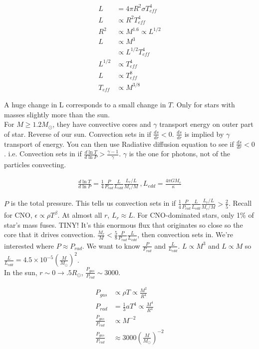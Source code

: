 \documentclass[10pt,a4paper]{article}
\newcommand{\pt}{\propto}
\begin{document}
\begin{align}
L & = 4 \pi R^2 \sigma T_{eff}^4\\
L & \pt R^2 T_{eff}^4\\
R^2  & \pt M^{1.6} \pt L^{1/2}\\
L & \pt M^3\\
   & \pt L^{1/2}T_{eff}^4\\
L^{1/2} & \pt T_{eff}^4\\
L & \pt T_{eff}^8\\
T_{eff} & \pt M^{3/8}
\end{align}

A huge change in L corresponds to a small change in $T$. Only for stars with masses slightly more than the sun. \\

For $M \geq 1.2 M_\odot$, they have convective cores and $\gamma$ transport energy on outer part of star. Reverse of our sun. Convection sets in if $\frac{ds}{dr} < 0$. $\frac{ds}{dr}$ is implied by $\gamma$ transport of energy. You can then use Radiative diffusion equation to see if $\frac{ds}{dr}<0$. i.e. Convection sets in if $\frac{d \ln T}{d \ln P} > \frac{\gamma -1}{\gamma}$. $\gamma$ is the one for photons, not of the particles convecting. 

\begin{align}
\frac{d \ln T}{d \ln P}  = \frac{1}{4} \frac{P}{P_{rad}}\frac{L}{L_{edd}}\frac{L_r/L}{M_r/M}~,L_{edd} = \frac{4 \pi G M_c}{\kappa}
\end{align}

$P$ is the total pressure. This tells us convection sets in if $\frac{1}{4} \frac{P}{P_{rad}}\frac{L}{L_{edd}}\frac{L_r/L}{M_r/M} > \frac{2}{5}$. Recall for CNO, $\epsilon \pt \rho T^\beta$. At almost all $r$, $L_r \approx L$. For CNO-dominated stars, only 1\% of star's mass fuses. TINY! It's this enormous flux that originates so close so the core that it drives convection. $\frac{M_r}{M} < \frac{5}{8} \frac{P}{P_{rad}}\frac{L}{L_{edd}}$, then convection sets in. We're interested where $P \approx P_{rad}$. We want to know $\frac{P}{P_{rad}}$ and $\frac{L}{L_{edd}}$. $L \pt M^3$ and $L \pt M$ so $\frac{L}{L_{edd}} = 4.5 \times 10^{-5} \left( \frac{M}{M_\odot} \right)^2$. \\

In the sun, $r \sim 0 \rightarrow .5 R_\odot$, $\frac{P_{gas}}{P_{rad}} \sim 3000$.

\begin{align}
P_{gas} &\pt \rho T \pt \frac{M^2}{R^4}\\
P_{rad}& = \frac{1}{3}a T^4 \pt \frac{M^4}{R^4}\\
\frac{P_{gas}}{P_{rad}} &\pt M^{-2}\\
\frac{P_{gas}}{P_{rad}} &\approx 3000 \left( \frac{M}{M_\odot} \right)^{-2}
\end{align}
\end{document}
